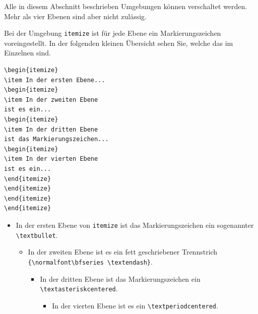 \documentclass[a4paper,10pt,twoside]{scrbook}
\begin{document}
Alle in diesem Abschnitt beschrieben Umgebungen können verschaltet werden. Mehr als vier Ebenen sind aber nicht zulässig. 

Bei der Umgebung \verb!itemize! ist für jede Ebene ein Markierungszeichen voreingestellt. In der folgenden kleinen Übersicht sehen Sie, welche das im Einzelnen sind.



\begin{minipage}[h]{0.44\textwidth}
\setlength{\parskip}{1em}
\frenchspacing
\begin{Verbatim}[frame=single]
\begin{itemize}
\item In der ersten Ebene...
\begin{itemize}
\item In der zweiten Ebene
ist es ein...
\begin{itemize}
\item In der dritten Ebene
ist das Markierungszeichen...
\begin{itemize}
\item In der vierten Ebene 
ist es ein...
\end{itemize}
\end{itemize}
\end{itemize}
\end{itemize}
\end{Verbatim}
\end{minipage}
\hfill
\begin{minipage}[h]{0.54\textwidth}
\setlength{\parskip}{1em}
\frenchspacing
\begin{itemize}
\item In der ersten Ebene von \texttt{itemize} ist das Markierungszeichen ein sogenannter
\texttt{\textbackslash textbullet}.
\begin{itemize}
\item In der zweiten Ebene ist es ein fett geschriebener Trennstrich
\texttt{\{\textbackslash normalfont\textbackslash bfseries \textbackslash textendash\}}.
\begin{itemize}
\item In der dritten Ebene ist das Markierungszeichen ein \texttt{\textbackslash textasteriskcentered}.
\begin{itemize}
\item In der vierten Ebene ist es ein \texttt{\textbackslash textperiodcentered}. 
\end{itemize}
\end{itemize}
\end{itemize}
\end{itemize}
\end{minipage}
\end{document}
